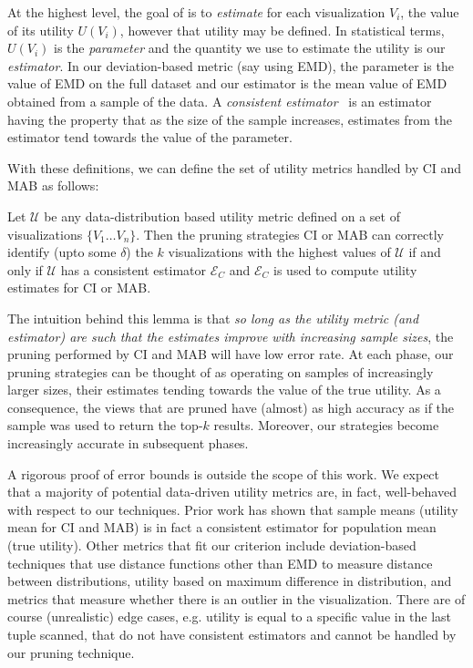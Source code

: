 {%

At the highest level, the goal of \SeeDB is to {\em estimate} for each visualization $V_i$, 
the value of its utility $U(V_i)$, however that utility may be defined.
In statistical terms, $U(V_i)$ is the {\em parameter} and the quantity we use to estimate the
utility is our {\em estimator}.
In our deviation-based metric (say using EMD), the parameter is the value of EMD on the full
dataset and our estimator is the mean value of EMD obtained from a sample of the data.
A {\em consistent estimator}~\cite{consistent_estimator} is an estimator having the property 
that as the size of the sample increases, estimates from the estimator tend towards the value 
of the parameter. 

With these definitions, we can define the set of utility metrics handled by CI and MAB as follows:
\begin{lemma}
Let $\mathcal{U}$ be any data-distribution based utility metric defined on a set of visualizations $\{
V_1 \ldots V_n\}$. Then the pruning strategies CI or MAB can correctly identify (upto some $\delta$) the 
$k$ visualizations with the highest values of $\mathcal{U}$ if and only if $\mathcal{U}$ has a consistent 
estimator $\mathcal{E}_C$ and $\mathcal{E}_C$ is used to compute utility estimates for CI or MAB.
\end{lemma}

The intuition behind this lemma is that {\em so long as the utility metric (and estimator) are such that
the estimates improve with increasing sample sizes}, the pruning performed by CI and MAB will have low
error rate.
At each phase, our pruning strategies can be thought of as operating on samples of increasingly larger
sizes, their estimates tending towards the value of the true utility.
As a consequence, the views that are pruned have (almost) as high accuracy as if the sample was used to
return the top-$k$ results.
Moreover, our strategies become increasingly accurate in subsequent phases.

A rigorous proof of error bounds is outside the scope of this work.
We expect that a majority of potential data-driven utility metrics are, in fact, well-behaved with respect to 
our techniques.
Prior work has shown that sample means (utility mean for CI and MAB) is in fact a consistent estimator for
population mean (true utility)\cite{mean_is_consistent}.
Other metrics that fit our criterion include deviation-based techniques that use distance functions other than 
EMD to measure distance between distributions, utility based on maximum difference in distribution, 
and metrics that measure whether there is an outlier in the visualization.
There are of course (unrealistic) edge cases, e.g. utility is equal to a specific value in the last tuple scanned, that
do not have consistent estimators and cannot be handled by our pruning technique.

}
